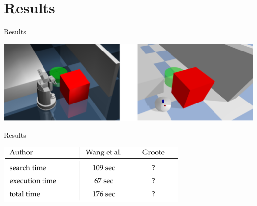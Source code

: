 \section{Results}
\begin{frame}[fragile]{Results} 
\begin{center}
 \includegraphics[width=1.0\textwidth]{figures/results/compare_sota}
\end{center}
\end{frame}


\begin{frame}[fragile]{Results} 
\begin{center}
 \includegraphics[width=0.7\textwidth]{figures/results/wang_groote_1}
\end{center}
\end{frame}

